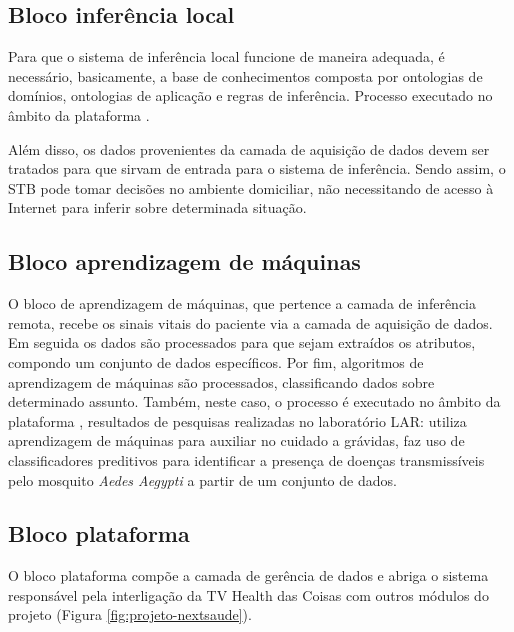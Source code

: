\subsection{Bloco inferência local}

Para que o sistema de inferência local funcione de maneira adequada, é
necessário, basicamente, a base de conhecimentos composta por ontologias de
domínios, ontologias de aplicação e regras de inferência. Processo executado
no âmbito da plataforma \nextsaude.

Além disso, os dados provenientes da camada de aquisição de dados devem ser
tratados para que sirvam de entrada para o sistema de inferência. Sendo assim,
o STB pode tomar decisões no ambiente domiciliar, não necessitando de acesso
à Internet para inferir sobre determinada situação.

\subsection{Bloco aprendizagem de máquinas}

O bloco de aprendizagem de máquinas, que pertence a camada de inferência
remota, recebe os sinais vitais do paciente via a camada de aquisição de dados.
Em seguida os dados são processados para que sejam extraídos os atributos,
compondo um conjunto de dados específicos. Por fim, algoritmos de aprendizagem
de máquinas são processados, classificando dados sobre determinado assunto.
Também, neste caso, o processo é executado no âmbito da plataforma \nextsaude,
resultados de pesquisas realizadas no laboratório LAR: \citeauthor{mario2016}
utiliza aprendizagem de máquinas para auxiliar no cuidado a grávidas,
\citeauthor{bragamobile} faz uso de classificadores preditivos para identificar
a presença de doenças transmissíveis pelo mosquito \textit{Aedes Aegypti} a
partir de um conjunto de dados. 

\subsection{Bloco plataforma \nextsaude}

O bloco plataforma \nextsaude[] compõe a camada de gerência de dados e abriga
o sistema responsável pela interligação da TV Health das Coisas com outros módulos
do projeto \nextsaude[] (Figura \ref{fig:projeto-nextsaude}).


